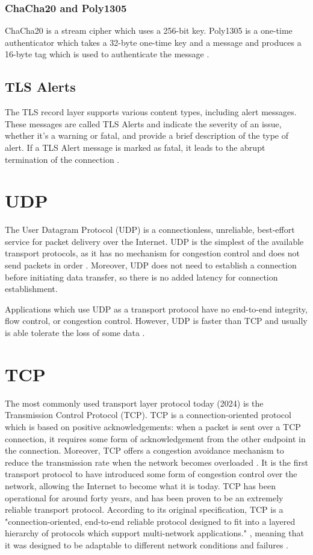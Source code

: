 \documentclass{l4proj}
\begin{document}
\subsubsection{ChaCha20 and Poly1305}

ChaCha20 is a stream cipher which uses a 256-bit key. Poly1305 is a one-time authenticator which takes a 32-byte one-time key and a message and produces a 16-byte tag which is used to authenticate the message \citep{Nir2018}.

\subsection{TLS Alerts}

The TLS record layer supports various content types, including alert messages. These messages are called TLS Alerts and indicate the severity of an issue, whether it's a warning or fatal, and provide a brief description of the type of alert. If a TLS Alert message is marked as fatal, it leads to the abrupt termination of the connection \citep{Resc2018}. 


\section{UDP}

The User Datagram Protocol (UDP) is a connectionless, unreliable, best-effort service for packet delivery over the Internet. UDP is the simplest of the available transport protocols, as it has no mechanism for congestion control and does not send packets in order \citep{Postel1980}. Moreover, UDP does not need to establish a connection before initiating data transfer, so there is no added latency for connection establishment.

Applications which use UDP as a transport protocol have no end-to-end integrity, flow control, or congestion control. However, UDP is faster than TCP and usually is able tolerate the loss of some data \citep{Rahoum2020}. 


\section{TCP}

The most commonly used transport layer protocol today (2024) is the Transmission Control Protocol (TCP). TCP is a connection-oriented protocol which is based on positive acknowledgements: when a packet is sent over a TCP connection, it requires some form of acknowledgement from the other endpoint in the connection. Moreover, TCP offers a congestion avoidance mechanism to reduce the transmission rate when the network becomes overloaded \citep{Rahoum2020}. It is the first transport protocol to have introduced some form of congestion control over the network, allowing the Internet to become what it is today. TCP has been operational for around forty years, and has been proven to be an extremely reliable transport protocol. According to its original specification, TCP is a "connection-oriented, end-to-end reliable protocol designed to fit into a layered hierarchy of protocols which support multi-network applications." \citep{Postel1981}, meaning that it was designed to be adaptable to different network conditions and failures \citep{Rahoum2020}. 
\end{document}

